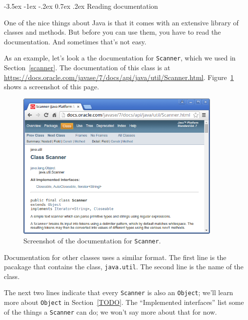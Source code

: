 \documentclass[12pt]{book}
\makeatletter
\theoremstyle{exercise}
\newcommand{\java}[1]{\verb"#1"}
\renewcommand{\section}{\@startsection{section}{1}{\z@}%
    {-3.5ex \@plus -1ex \@minus -.2ex}%
    {0.7ex \@plus.2ex}%
    {\normalfont\Large\bfseries}}
\newcommand{\java}[1]{\lstinline{#1}} %
\makeatother
\begin{document}
\section{Reading documentation}
\label{sec:apidocs}


One of the nice things about Java is that it comes with an extensive library of classes and methods.
But before you can use them, you have to read the documentation.
And sometimes that's not easy.

As an example, let's look a the documentation for \java{Scanner}, which we used in Section~\ref{scanner}.
The documentation of this class is at \url{https://docs.oracle.com/javase/7/docs/api/java/util/Scanner.html}.
Figure~\ref{fig:javadoc} shows a screenshot of this page.

\begin{figure}[!h]
\begin{center}
\includegraphics[width=0.9\textwidth]{figs/scanner.png}
\caption{Screenshot of the documentation for \java{Scanner}.}
\label{fig:javadoc}
\end{center}
\end{figure}

Documentation for other classes uses a similar format.
The first line is the pacakage that contains the class, \java{java.util}.
The second line is the name of the class.

The next two lines indicate that every \java{Scanner} is also an \java{Object}; we'll learn more about \java{Object} in Section~\ref{TODO}.
The ``Implemented interfaces'' list some of the things a \java{Scanner} can do; we won't say more about that for now.
\end{document}
